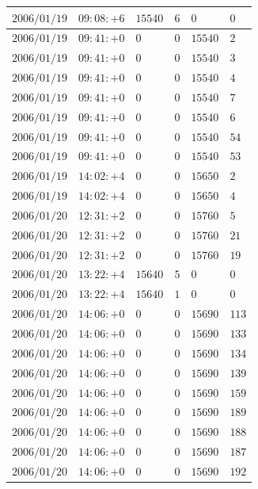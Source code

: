 \documentclass[a4j,papersize,disablejfam,slide,14pt]{jsarticle}
\begin{document}
\begin{description}
\begin{center}
\begin{longtable}{|l|l|l|l|l|l|}
					$2006/01/19$ & $09:08:+6$  & $15540$ & $6$ & $0$ & $0$ \\ \hline
					$2006/01/19$ & $09:41:+0$  & $0$ & $0$ & $15540$ & $2$ \\ \hline
					$2006/01/19$ & $09:41:+0$  & $0$ & $0$ & $15540$ & $3$ \\ \hline
					$2006/01/19$ & $09:41:+0$  & $0$ & $0$ & $15540$ & $4$ \\ \hline
					$2006/01/19$ & $09:41:+0$  & $0$ & $0$ & $15540$ & $7$ \\ \hline
					$2006/01/19$ & $09:41:+0$  & $0$ & $0$ & $15540$ & $6$ \\ \hline
					$2006/01/19$ & $09:41:+0$  & $0$ & $0$ & $15540$ & $54$ \\ \hline
					$2006/01/19$ & $09:41:+0$  & $0$ & $0$ & $15540$ & $53$ \\ \hline
					$2006/01/19$ & $14:02:+4$  & $0$ & $0$ & $15650$ & $2$ \\ \hline
					$2006/01/19$ & $14:02:+4$  & $0$ & $0$ & $15650$ & $4$ \\ \hline
					$2006/01/20$ & $12:31:+2$  & $0$ & $0$ & $15760$ & $5$ \\ \hline
					$2006/01/20$ & $12:31:+2$  & $0$ & $0$ & $15760$ & $21$ \\ \hline
					$2006/01/20$ & $12:31:+2$  & $0$ & $0$ & $15760$ & $19$ \\ \hline
					$2006/01/20$ & $13:22:+4$  & $15640$ & $5$ & $0$ & $0$ \\ \hline
					$2006/01/20$ & $13:22:+4$  & $15640$ & $1$ & $0$ & $0$ \\ \hline
					$2006/01/20$ & $14:06:+0$  & $0$ & $0$ & $15690$ & $113$ \\ \hline
					$2006/01/20$ & $14:06:+0$  & $0$ & $0$ & $15690$ & $133$ \\ \hline
					$2006/01/20$ & $14:06:+0$  & $0$ & $0$ & $15690$ & $134$ \\ \hline
					$2006/01/20$ & $14:06:+0$  & $0$ & $0$ & $15690$ & $139$ \\ \hline
					$2006/01/20$ & $14:06:+0$  & $0$ & $0$ & $15690$ & $159$ \\ \hline
					$2006/01/20$ & $14:06:+0$  & $0$ & $0$ & $15690$ & $189$ \\ \hline
					$2006/01/20$ & $14:06:+0$  & $0$ & $0$ & $15690$ & $188$ \\ \hline
					$2006/01/20$ & $14:06:+0$  & $0$ & $0$ & $15690$ & $187$ \\ \hline
					$2006/01/20$ & $14:06:+0$  & $0$ & $0$ & $15690$ & $192$ \\ \hline

\end{longtable}
\end{center}
\end{description}
\end{document}
